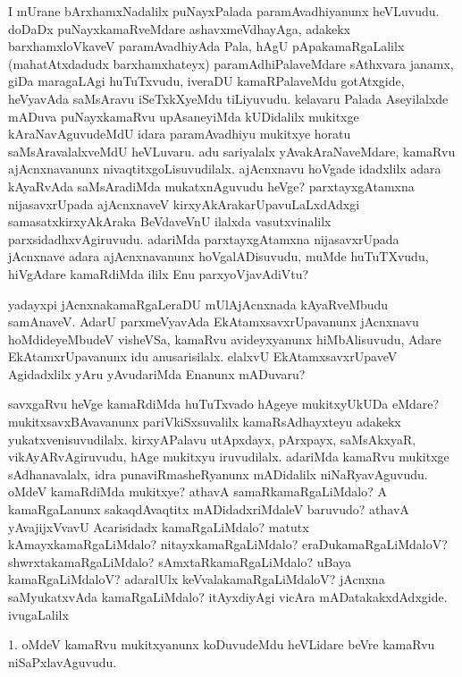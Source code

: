 \begin{artha}
I mUrane bArxhamxNadalilx puNayxPalada paramAvadhiyanunx heVLuvudu. doDaDx puNayxkamaRveMdare ashavxmeVdhayAga, adakekx barxhamxloVkaveV paramAvadhiyAda Pala, hAgU pApakamaRgaLalilx (mahatAtxdadudx barxhamxhateyx) paramAdhiPalaveMdare sAthxvara janamx, giDa maragaLAgi huTuTxvudu, iveraDU kamaRPalaveMdu gotAtxgide, heVyavAda saMsAravu iSeTxkXyeMdu tiLiyuvudu. kelavaru Palada Aseyilalxde mADuva puNayxkamaRvu upAsaneyiMda kUDidalilx mukitxge kAraNavAguvudeMdU idara paramAvadhiyu mukitxye horatu saMsAravalalxveMdU heVLuvaru. adu sariyalalx \ndash  yAvakAraNaveMdare, kamaRvu ajAcnxnavanunx nivaqtitxgoLisuvudilalx. ajAcnxnavu hoVgade idadxlilx adara kAyaRvAda saMsAradiMda mukatxnAguvudu heVge? parxtayxgAtamxna nijasavxrUpada ajAcnxnaveV kirxyAkArakarUpavuLaLxdAdxgi samasatxkirxyAkAraka BeVdaveVnU ilalxda vasutxvinalilx parxsidadhxvAgiruvudu. adariMda parxtayxgAtamxna nijasavxrUpada jAcnxnave adara ajAcnxnavanunx hoVgalADisuvudu, muMde huTuTXvudu, hiVgAdare kamaRdiMda ililx Enu parxyoVjavAdiVtu?

yadayxpi jAcnxnakamaRgaLeraDU mUlAjAcnxnada kAyaRveMbudu  samAnaveV. AdarU parxmeVyavAda EkAtamxsavxrUpavanunx jAcnxnavu hoMdideyeMbudeV visheVSa, kamaRvu avideyxyanunx hiMbAlisuvudu, Adare EkAtamxrUpavanunx idu anusarisilalx. elalxvU EkAtamxsavxrUpaveV Agidadxlilx yAru yAvudariMda Enanunx mADuvaru?
\end{artha}

\centerline{}

\begin{artha}
savxgaRvu heVge kamaRdiMda huTuTxvado hAgeye mukitxyUkUDa eMdare? mukitxsavxBAvavanunx pariVkiSxsuvalilx kamaRsAdhayxteyu adakekx yukatxvenisuvudilalx. kirxyAPalavu utApxdayx, pArxpayx, saMsAkxyaR, vikAyARvAgiruvudu, hAge mukitxyu iruvudilalx. adariMda kamaRvu mukitxge sAdhanavalalx, idra punaviRmasheRyanunx mADidalilx niNaRyavAguvudu. oMdeV kamaRdiMda mukitxye? athavA samaRkamaRgaLiMdalo? A kamaRgaLanunx sakaqdAvaqtitx mADidadxriMdaleV  baruvudo? athavA yAvajijxVvavU Acarisidadx kamaRgaLiMdalo? matutx kAmayxkamaRgaLiMdalo? nitayxkamaRgaLiMdalo? eraDukamaRgaLiMdaloV? shwrxtakamaRgaLiMdalo? sAmxtaRkamaRgaLiMdalo? uBaya kamaRgaLiMdaloV? adaralUlx keVvalakamaRgaLiMdaloV? jAcnxna saMyukatxvAda kamaRgaLiMdalo? itAyxdiyAgi vicAra mADatakakxdAdxgide. ivugaLalilx  
\end{artha}

\begin{artha}
1. oMdeV kamaRvu mukitxyanunx koDuvudeMdu heVLidare beVre kamaRvu niSaPxlavAguvudu.
\end{artha}

